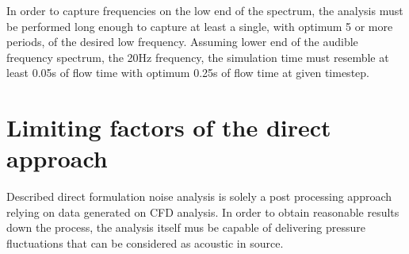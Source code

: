 






In order to capture frequencies on the low end of the spectrum, the analysis must be performed long enough to capture at least a single, with optimum 5 or more periods, of the desired low frequency. Assuming lower end of the audible frequency spectrum, the 20Hz frequency, the simulation time must resemble at least 0.05s of flow time with optimum 0.25s of flow time at given timestep.


\section{Limiting factors of the direct approach} \label{limits}
Described direct formulation noise analysis is solely a post processing approach relying on data generated on CFD analysis. In order to obtain reasonable results down the process, the analysis itself mus be capable of delivering pressure fluctuations that can be considered as acoustic in source. 

